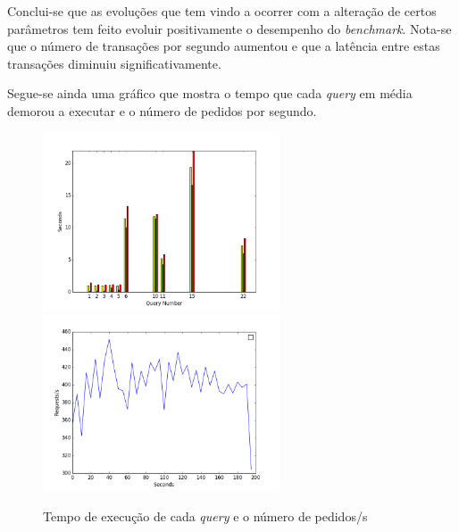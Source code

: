 Conclui-se que as evoluções que tem vindo a ocorrer com a alteração de certos parâmetros tem feito evoluir positivamente o desempenho do \textit{benchmark}. Nota-se que o número de transações por segundo aumentou e que a latência entre estas transações diminuiu significativamente.

Segue-se ainda uma gráfico que mostra o tempo que cada \textit{query} em média demorou a executar e o número de pedidos por segundo.

\begin{figure}[ht!]
\centering
\includegraphics[width=70mm]{img/questao_3/figure_1.png}
\includegraphics[width=70mm]{img/questao_3/figure_2.png}
\caption{Tempo de execução de cada \textit{query} e o número de pedidos/s}
\end{figure}
